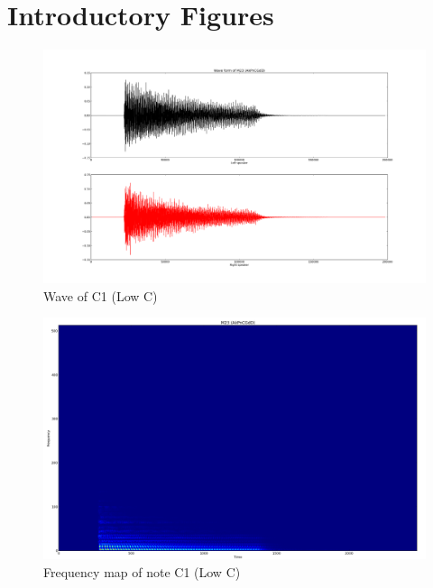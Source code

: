 \documentclass{article}
\begin{document}
\section{Introductory Figures}
\begin{figure}
\includegraphics[scale=.13]{wave_m23.png}
\caption{Wave of C1 (Low C)}
\label{fig:wave}
\end{figure}

\begin{figure}
\includegraphics[scale=.12]{freq_m23.png}
\caption{Frequency map of note C1 (Low C)}
\label{fig:freqs}
\end{figure}
\end{document}
